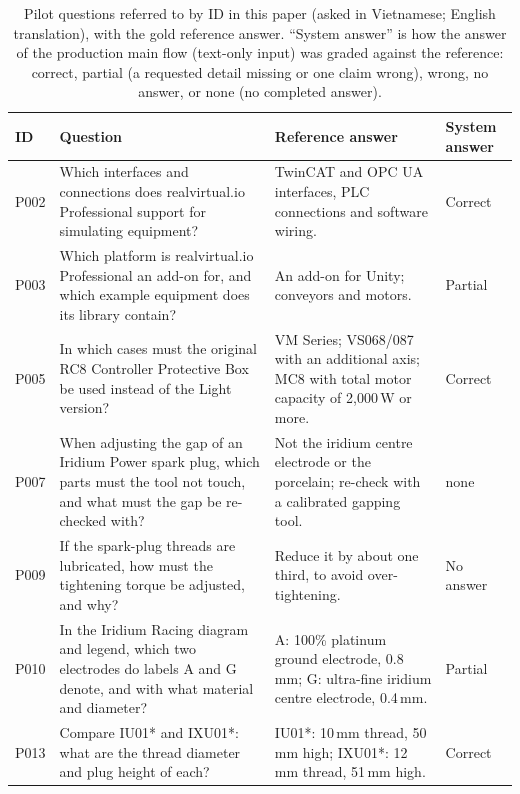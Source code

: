 \begin{table}[t]
\centering\footnotesize
\caption{Pilot questions referred to by ID in this paper (asked in Vietnamese; English translation), with the gold reference answer. ``System answer'' is how the answer of the production main flow (text-only input) was graded against the reference: correct, partial (a requested detail missing or one claim wrong), wrong, no answer, or none (no completed answer).}
\label{tab:questions}
\setlength{\tabcolsep}{4pt}
\begin{tabular}{@{}lp{}p{}l@{}}
\toprule
ID & Question & Reference answer & System answer \\
\midrule
P002 & Which interfaces and connections does realvirtual.io Professional support for simulating equipment? & TwinCAT and OPC UA interfaces, PLC connections and software wiring. & Correct \\
P003 & Which platform is realvirtual.io Professional an add-on for, and which example equipment does its library contain? & An add-on for Unity; conveyors and motors. & Partial \\
P005 & In which cases must the original RC8 Controller Protective Box be used instead of the Light version? & VM Series; VS068/087 with an additional axis; MC8 with total motor capacity of 2,000\,W or more. & Correct \\
P007 & When adjusting the gap of an Iridium Power spark plug, which parts must the tool not touch, and what must the gap be re-checked with? & Not the iridium centre electrode or the porcelain; re-check with a calibrated gapping tool. & none \\
P009 & If the spark-plug threads are lubricated, how must the tightening torque be adjusted, and why? & Reduce it by about one third, to avoid over-tightening. & No answer \\
P010 & In the Iridium Racing diagram and legend, which two electrodes do labels A and G denote, and with what material and diameter? & A: 100\% platinum ground electrode, 0.8\,mm; G: ultra-fine iridium centre electrode, 0.4\,mm. & Partial \\
P013 & Compare IU01* and IXU01*: what are the thread diameter and plug height of each? & IU01*: 10\,mm thread, 50\,mm high; IXU01*: 12\,mm thread, 51\,mm high. & Correct \\

\end{tabular}
\end{table}
